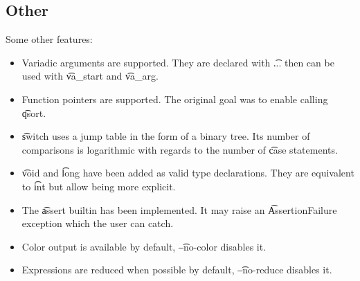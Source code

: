 \subsection{Other}
Some other features:
\begin{itemize}
    \item Variadic arguments are supported. They are declared with \t{...} then can be used with \t{va\_start} and \t{va\_arg}.
    \item Function pointers are supported. The original goal was to enable calling \t{qsort}.
    \item \t{switch} uses a jump table in the form of a binary tree. Its number of comparisons is logarithmic with regards to the number of \t{case} statements.
    \item \t{void} and \t{long} have been added as valid type declarations. They are equivalent to \t{int} but allow being more explicit.
    \item The \t{assert} builtin has been implemented. It may raise an \t{AssertionFailure} exception which the user can catch.
    \item Color output is available by default, \t{--no-color} disables it.
    \item Expressions are reduced when possible by default, \t{--no-reduce} disables it.
\end{itemize}
